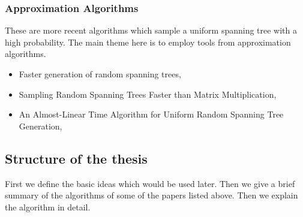 \subsubsection{Approximation Algorithms}
These are more recent algorithms which sample a uniform spanning tree with a high probability. The main theme here is to employ tools from approximation algorithms. 
\begin{itemize}
\item Faster generation of random spanning trees, \cite{10.5555/1747597.1748019}
\item Sampling Random Spanning Trees Faster than Matrix Multiplication, \cite{10.1145/3055399.3055499}
\item An Almost-Linear Time Algorithm for Uniform Random Spanning Tree Generation, \cite{10.1145/3188745.3188852}
\end{itemize}

\subsection{Structure of the thesis}

First we define the basic ideas which would be used later. Then we give a brief summary of the algorithms of some of the papers listed above. Then we explain the \citet{harvey2016generating} algorithm in detail.



